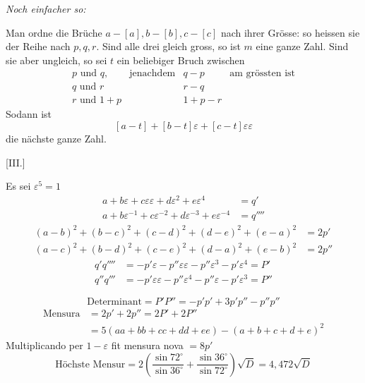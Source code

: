 \emph{Noch einfacher so:}

Man ordne die Brüche $a-[a],b-[b],c-[c]$ nach ihrer Grösse: so heissen sie der Reihe nach $p,q,r$. Sind alle drei gleich gross, so ist $m$ eine ganze Zahl. Sind sie aber ungleich, so sei $t$ ein beliebiger Bruch zwischen
\[
\begin{array}{llll}
p\text{ und }q,&\text{jenachdem}&q-p&\text{am grössten ist}\\
q\text{ und }r&&r-q&\\
r\text{ und }1+p&&1+p-r&
\end{array}
\]
Sodann ist
\[
[a-t]+[b-t]\varepsilon+[c-t]\varepsilon\varepsilon
\]
die nächste ganze Zahl.

%
\begin{center}[III.]\end{center}
Es sei $\varepsilon^5=1$
\[
\begin{aligned}
a+b\varepsilon+c\varepsilon\varepsilon+d\varepsilon^2+e\varepsilon^4&=q'\\
a+b\varepsilon^{-1}+c\varepsilon^{-2}+d\varepsilon^{-3}+e\varepsilon^{-4}&=q''''
\end{aligned}
\]
\[
\begin{aligned}
(a-b)^2+(b-c)^2+(c-d)^2+(d-e)^2+(e-a)^2&=2p'\\
(a-c)^2+(b-d)^2+(c-e)^2+(d-a)^2+(e-b)^2&=2p''
\end{aligned}
\]
\[
\begin{aligned}
q'q''''&=-p'\varepsilon-p''\varepsilon\varepsilon-p''\varepsilon^3-p'\varepsilon^4=P'\\
q''q'''&=-p'\varepsilon\varepsilon-p''\varepsilon^4-p''\varepsilon-p'\varepsilon^3=P''
\end{aligned}
\]

\[
\text{Determinant}=P'P''=-p'p'+3p'p''-p''p''
\]
\[
\begin{aligned}
\text{Mensura}&=2p'+2p''=2P'+2P''\\
&=5(aa+bb+cc+dd+ee)-(a+b+c+d+e)^2
\end{aligned}
\]
Multiplicando per $1-\varepsilon$ fit mensura nova $=8p'$
\[
\text{Höchste Mensur}=2\left(\frac{\sin72^\circ}{\sin36^\circ}+\frac{\sin36^\circ}{\sin72^\circ}\right)\surd D=4{,}472\surd D
\]


